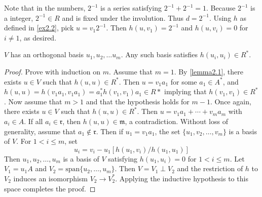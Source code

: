 \begin{example}
Note that in the \padic numbers, $2^{-1}$ is a series satisfying $2^{-1} + 2^{-1} = 1$.
Because $2^{-1}$ is a \padic integer, $2^{-1} \in R$ and is fixed under the involution.
Thus $d = 2^{-1}$.
Using $h$ as defined in \cref{ex2.2}, pick $u = v_1 2^{-1}$.
Then $h(u, v_1) = 2^{-1}$ and $h(u, v_i) = 0$ for $i \ne 1$, as desired.
\end{example}

\begin{lemma}\label{lemma2.2}
$V$ has an orthogonal basis $u_1, u_2, \dotsc u_m$.
Any such basis satisfies $h(u_i, u_i) \in R^*$.
\end{lemma}
\begin{proof}
Prove with induction on $m$.
Assume that $m = 1$.
By \cref{lemma2.1}, there exists $u \in V$ such that $h(u,u) \in R^*$.
Then $u = v_1a_1$ for some $a_1 \in A^*$, and $h(u,u) = h(v_1a_1, v_1a_1) = a_1^*h(v_1,v_1)a_1 \in R*$ implying that $h(v_1, v_1) \in R^*$.
Now assume that $m > 1$ and that the hypothesis holds for $m - 1$.
Once again, there exists $u \in V$ such that $h(u,u) \in R^*$.
Then $u = v_1a_1 + \dotsb + v_m a_m$ with $a_i \in A$.
If all $a_i \in \mathfrak{r}$, then $h(u,u) \in \mathfrak{m}$, a contradiction.
Without loss of generality, assume that $a_1 \not\in \mathfrak{r}$.
Then if $u_1 = v_1 a_1$, the set $\{u_1, v_2, \dotsc, v_m\}$ is a basis of $V$.
For $1 < i \le m$, set
\[
u_i = v_i - u_1[h(u_1,v_i)/h(u_1, u_1)]
\]
Then $u_1, u_2, \dotsc, u_m$ is a basis of $V$ satisfying $h(u_1, u_i) = 0$ for $1 < i \le m$.
Let $V_1 = u_1 A$ and $V_2 = \text{span} \{u_2, \dotsc, u_m\}$.
Then $V = V_1 \perp V_2$ and the restriction of $h$ to $V_2$ induces an isomorphism $V_2 \to V_2^*$.
Applying the inductive hypothesis to this space completes the proof.
\end{proof}

